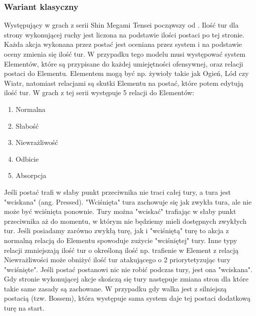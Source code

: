\documentclass{SGGW-thesis}
\begin{document}
\subsubsection{Wariant klasyczny}
Występujący w grach z serii Shin Megami Tensei począwszy od \cite{SMT3}. Ilość tur dla strony wykonującej ruchy jest liczona na podstawie ilości postaci po tej stronie. Każda akcja wykonana przez postać jest oceniana przez system i na podstawie oceny zmienia się ilość tur. W przypadku tego modelu musi występować system 
Elementów, które są przypisane do każdej umiejętności ofensywnej, oraz relacji postaci do Elementu. Elementem mogą być np. żywioły takie jak Ogień, Lód czy Wiatr, natomiast relacjami są skutki Elementu na postać, które potem edytują ilość tur. W grach z tej serii występuje 5 relacji do Elementów:
\begin{enumerate}
  \item{Normalna}
  \item{Słabość}
  \item{Niewrażliwość}
  \item{Odbicie}
  \item{Absorpcja}
\end{enumerate}
Jeśli postać trafi w słaby punkt przeciwnika nie traci całej tury, a tura jest "wciskana" (ang. Pressed). "Wciśnięta" tura zachowuje się jak zwykła tura, ale nie może być wciśnięta ponownie. Tury można "wciskać" trafiając w słaby punkt przeciwnika aż do momentu, w którym nie będziemy mieli dostępnych zwykłych tur.
Jeśli posiadamy zarówno zwykłą turę, jak i "wciśniętą" turę to akcja z normalną relacją do Elementu spowoduje zużycie "wciśniętej" tury. Inne typy relacji zmniejszają ilość tur o określoną ilość np. trafienie w Element z relacją Niewrażliwości może obniżyć ilość tur atakującego o 2 priorytetyzując tury "wciśnięte".
Jeśli postać postanowi nic nie robić podczas tury, jest ona "wciskana". Gdy stronie wykonującej akcje skończą się tury następuje zmiana stron dla które takie same zasady są zachowane. W przypadku gdy walka jest z silniejszą postacią (tzw. Bossem), która występuje sama system daje tej postaci dodatkową turę na start.
\end{document}
